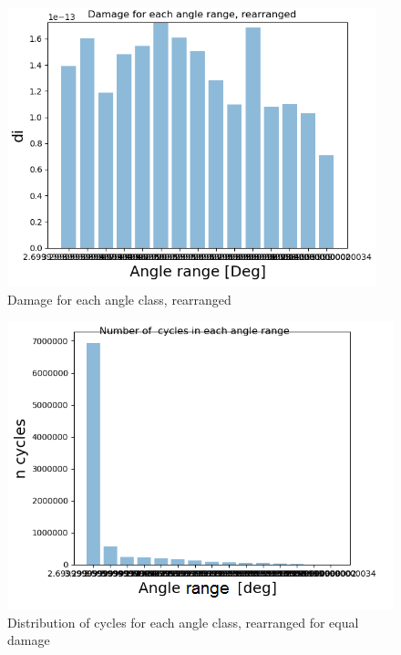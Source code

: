 \begin{figure}[H]
\centering
\includegraphics[scale=0.9]{figures/newdam}
\caption[$\; \:$Damage for each angle class, rearranged]{Damage for each angle class, rearranged}
 \label{fig:newdam}
\end{figure}

\begin{figure}[H]
\centering
\includegraphics[scale=1]{figures/newcyc}
\caption[$\; \:$Distribution of cycles for each angle class, rearranged]{Distribution of cycles for each angle class, rearranged for equal damage}
 \label{fig:newcyc}
\end{figure}

